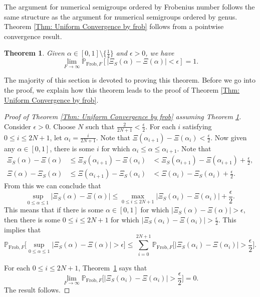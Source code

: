 \documentclass[12pt]{amsart}
\renewcommand{\P}{\mathbb{P}}
\newcommand{\Frob}{\text{Frob}}
\newtheorem{theorem}{Theorem}
\begin{document}
The argument for numerical semigroups ordered by Frobenius number follows the same structure as the argument for numerical semigroups ordered by genus. Theorem \ref{Thm: Uniform Convergence by frob} follows from a pointwise convergence result.

\begin{theorem}\label{Thm: Frob pointwise convergence}
Given $\alpha\in[0,1]\setminus\{\frac{1}{4}\}$ and $\epsilon>0$, we have
\[
\lim_{F\to\infty} \P_{\Frob,F}[ |\Xi_S(\alpha) -\Xi(\alpha)|<\epsilon ] =1.
\]
\end{theorem}

The majority of this section is devoted to proving this theorem.  Before we go into the proof, we explain how this theorem leads to the proof of Theorem \ref{Thm: Uniform Convergence by frob}.

\begin{proof}[Proof of Theorem \ref{Thm: Uniform Convergence by frob} assuming Theorem \ref{Thm: Frob pointwise convergence}]

Consider $\epsilon>0$.
Choose $N$ such that $\frac{2}{2N+1} <\frac{\epsilon}{2}$. For each $i$ satisfying $0 \le i \le 2N+1$, let $\alpha_i=\frac{i}{2N+1}$. Note that $\Xi(\alpha_{i+1})-\Xi(\alpha_i)<\frac{\epsilon}{2}$.
Now given any $\alpha\in [0,1]$, there is some $i$ for which $\alpha_i\leq \alpha\leq \alpha_{i+1}$. Note that
\begin{eqnarray*}
\Xi_S(\alpha)-\Xi(\alpha) & \leq \Xi_S(\alpha_{i+1})-\Xi(\alpha_i) & < \Xi_S(\alpha_{i+1})-\Xi(\alpha_{i+1}) +\frac{\epsilon}{2},\\
\Xi(\alpha)-\Xi_S(\alpha) & \leq \Xi(\alpha_{i+1})-\Xi_S(\alpha_i)  &< \Xi(\alpha_{i})-\Xi_S(\alpha_{i}) +\frac{\epsilon}{2}.
\end{eqnarray*}
From this we can conclude that
\[\sup_{0\leq \alpha\leq 1} |\Xi_S(\alpha)-\Xi(\alpha)| \leq \max_{0\leq i\leq 2N+1} |\Xi_S(\alpha_i)- \Xi(\alpha_i)| +\frac{\epsilon}{2}.\]
This means that if there is some $\alpha\in[0,1]$ for which $|\Xi_S(\alpha)-\Xi(\alpha)|>\epsilon$, then there is some $0\leq i\leq 2N+1$ for which $|\Xi_S(\alpha_i)-\Xi(\alpha_i)|>\frac{\epsilon}{2}$. This implies that
\[
\P_{\Frob,F}
\Big[ \sup_{0\leq \alpha\leq 1} |\Xi_S(\alpha) -\Xi(\alpha)| >\epsilon \Big] 
\leq \sum_{i=0}^{2N+1} 
\P_{\Frob,F}
\Big[ |\Xi_S(\alpha_i) -\Xi(\alpha_i)| >\frac{\epsilon}{2} \Big].
\]

For each $0\leq i\leq 2N+1$, Theorem~\ref{Thm: Frob pointwise convergence} says that
\[
\lim_{F\to\infty} \P_{\Frob,F}
\Big[ |\Xi_S(\alpha_i) -\Xi(\alpha_i)| 
>\frac{\epsilon}{2} \Big] 
= 0.
\]
The result follows.
\end{proof}
\end{document}
